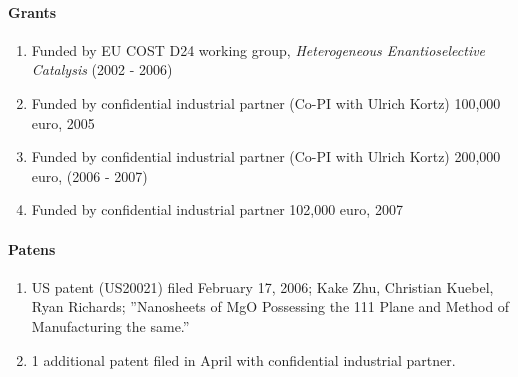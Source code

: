 \paragraph{Grants}
\begin{enumerate}
\item Funded by EU COST D24 working group, \emph{Heterogeneous Enantioselective Catalysis}
  (2002 - 2006)
\item Funded by confidential industrial partner (Co-PI with Ulrich Kortz) 100,000 euro,
  2005
\item Funded by confidential industrial partner (Co-PI with Ulrich Kortz) 200,000 euro,
  (2006 - 2007)
\item Funded by confidential industrial partner 102,000 euro, 2007 
\end{enumerate}


\paragraph{Patens}
\begin{enumerate}
\item US patent (US20021) filed February 17, 2006; Kake Zhu,
Christian Kuebel, Ryan Richards; ''Nanosheets of MgO Possessing
the 111 Plane and Method of Manufacturing the same.'' \item 1
additional patent filed in April with confidential industrial
partner.
\end{enumerate}

\nocite{Richards1}
\nocite{Richards2}
\nocite{Richards3}
\nocite{Richards4}
\nocite{Richards5}
\nocite{Richards6}
\nocite{Richards7}
\nocite{Richards8}
\nocite{Richards9}
\nocite{Richards10}
\nocite{Richards11}
\nocite{Richards12}
